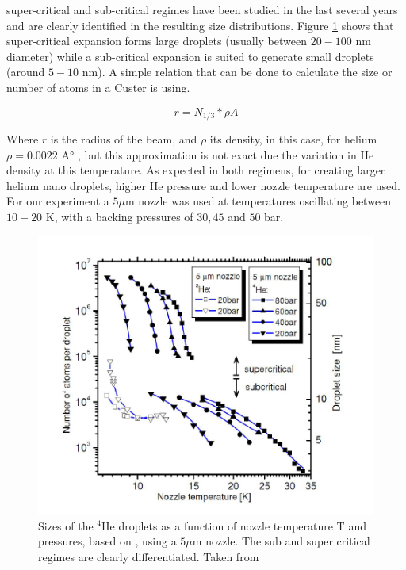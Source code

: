 super-critical and sub-critical regimes have been studied  in the last several years and  are clearly identified in the resulting size distributions. Figure \ref{img:dropletSize} shows that super-critical expansion forms large droplets (usually between $20-100$ nm diameter) while a sub-critical expansion is suited to generate small droplets (around $5-10$ nm).  A simple relation that can be done to calculate the size or number of atoms in a Custer is using. 

\begin{equation}
r=N_{1/3} * \rho A
\end{equation}

Where $r$ is the radius of the beam, and $\rho$ its density, in this case, for helium $\rho =0.0022$ A$°$  \cite{stringari_systematics_1987}, but this approximation is not exact due the variation in He density at this temperature. As expected in both regimens, for creating larger helium nano droplets, higher He pressure and lower nozzle temperature are used. For our experiment a $5 \mu$m nozzle was used at temperatures oscillating between $10-20$ K, with a backing pressures of $30, 45 $ and $ 50$ bar.

\begin{figure}[h!]
\centering
\label{img:dropletSize}
\includegraphics[scale=0.4]{../Images/sizes_regimen.PNG}
\caption[Expansion droplets Regimens]{Sizes of the $^{4}$He droplets  as a function of nozzle temperature T and  pressures, based on \cite{toennies_spectroscopy_1998}, using a $5 \mu $m nozzle. The sub and super critical regimes are clearly differentiated. Taken from \cite{stienkemeier_spectroscopy_2006}}
\end{figure}

